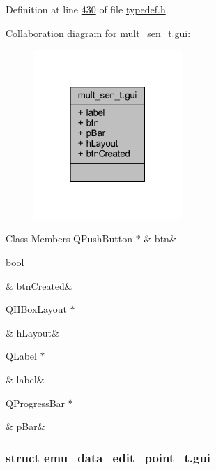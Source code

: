 Definition at line \hyperlink{a00001_source_l00430}{430} of file \hyperlink{a00001_source}{typedef.\+h}.



Collaboration diagram for mult\+\_\+sen\+\_\+t.\+gui\+:
\nopagebreak
\begin{figure}[H]
\begin{center}
\leavevmode
\includegraphics[width=160pt]{d5/d42/a00269}
\end{center}
\end{figure}
\begin{DoxyFields}{Class Members}
\hypertarget{a00001_ad4f5c2c94881b8db27f83be1703bfbef}{Q\+Push\+Button $\ast$}\label{a00001_ad4f5c2c94881b8db27f83be1703bfbef}
&
btn&
\\
\hline

\hypertarget{a00001_a2b308f151b5b29fe095c916d345dac14}{bool}\label{a00001_a2b308f151b5b29fe095c916d345dac14}
&
btn\+Created&
\\
\hline

\hypertarget{a00001_af2629dc10386ddd36710186488faeb78}{Q\+H\+Box\+Layout $\ast$}\label{a00001_af2629dc10386ddd36710186488faeb78}
&
h\+Layout&
\\
\hline

\hypertarget{a00001_ad304ba20e96d87411588eeabac850e34}{Q\+Label $\ast$}\label{a00001_ad304ba20e96d87411588eeabac850e34}
&
label&
\\
\hline

\hypertarget{a00001_aec24c249d83a4b7af1ab610dec789577}{Q\+Progress\+Bar $\ast$}\label{a00001_aec24c249d83a4b7af1ab610dec789577}
&
p\+Bar&
\\
\hline

\end{DoxyFields}
\label{da/d24/a00068}
\hypertarget{a00001_da/d24/a00068}{}
\subsubsection{struct emu\+\_\+data\+\_\+edit\+\_\+point\+\_\+t.\+gui}


